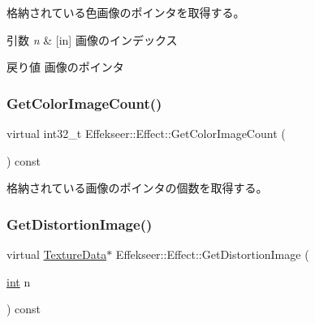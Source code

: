 格納されている色画像のポインタを取得する。 


\begin{DoxyParams}{引数}
{\em n} & \mbox{[}in\mbox{]} 画像のインデックス \\
\hline
\end{DoxyParams}
\begin{DoxyReturn}{戻り値}
画像のポインタ 
\end{DoxyReturn}
\mbox{\label{class_effekseer_1_1_effect_a50ca0307097782d1bced346e8090a56d}} 
\subsubsection{\texorpdfstring{Get\+Color\+Image\+Count()}{GetColorImageCount()}}
{\footnotesize\ttfamily virtual int32\+\_\+t Effekseer\+::\+Effect\+::\+Get\+Color\+Image\+Count (\begin{DoxyParamCaption}{ }\end{DoxyParamCaption}) const\hspace{0.3cm}{\ttfamily [pure virtual]}}



格納されている画像のポインタの個数を取得する。 

\mbox{\label{class_effekseer_1_1_effect_a846840e790b1b4dff1b5cb8f8bce44dc}} 
\subsubsection{\texorpdfstring{Get\+Distortion\+Image()}{GetDistortionImage()}}
{\footnotesize\ttfamily virtual \mbox{\hyperlink{struct_effekseer_1_1_texture_data}{Texture\+Data}}$\ast$ Effekseer\+::\+Effect\+::\+Get\+Distortion\+Image (\begin{DoxyParamCaption}\item[{\mbox{\hyperlink{namespace_effekseer_ace0abf7c2e6947e519ebe8b54cbcc30a}{int}}}]{n }\end{DoxyParamCaption}) const\hspace{0.3cm}{\ttfamily [pure virtual]}}



